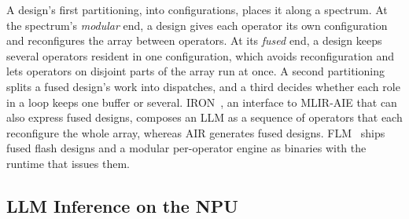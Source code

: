 A design's first partitioning, into configurations, places it along a spectrum.
At the spectrum's \emph{modular} end, a design gives each operator its own configuration and reconfigures the array between operators.
At its \emph{fused} end, a design keeps several operators resident in one configuration, which avoids reconfiguration and lets operators on disjoint parts of the array run at once.
A second partitioning splits a fused design's work into dispatches, and a third decides whether each role in a loop keeps one buffer or several.
IRON~\citep{hunhoff2025iron}, an interface to MLIR-AIE that can also express fused designs, composes an LLM as a sequence of operators that each reconfigure the whole array, whereas AIR generates fused designs.
FLM~\citep{fastflowlm-repo} ships fused flash designs and a modular per-operator engine as binaries with the runtime that issues them.

\subsection{LLM Inference on the NPU}
\label{subsec:prefill}

